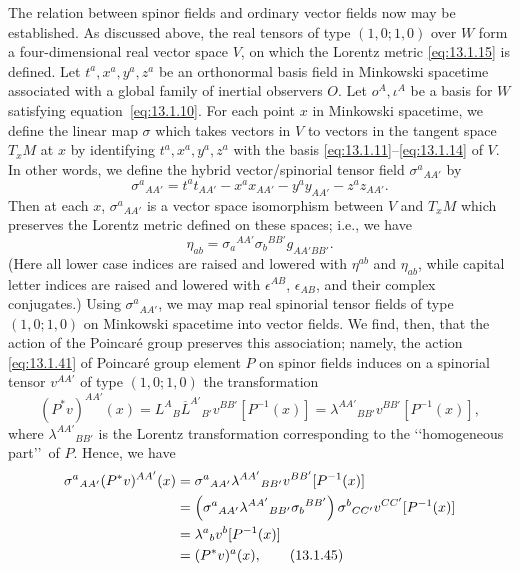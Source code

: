 The relation between spinor fields and ordinary vector fields now may be established.
As discussed above, the real tensors of type \((1,0;1,0)\) over \(W\) form a
four-dimensional real vector space \(V\), on which the Lorentz metric
\eqref{eq:13.1.15} is defined. Let \(t^a,x^a,y^a,z^a\) be an orthonormal basis field
in Minkowski spacetime associated with a global family of inertial observers \(O\).
Let \(o^A,\iota^A\) be a basis for \(W\) satisfying equation~\eqref{eq:13.1.10}. For
each point \(x\) in Minkowski spacetime, we define the linear map \(\sigma\) which
takes vectors in \(V\) to vectors in the tangent space \(T_xM\) at \(x\) by
identifying \(t^a,x^a,y^a,z^a\) with the basis
\eqref{eq:13.1.11}--\eqref{eq:13.1.14} of \(V\). In other words, we define the
hybrid vector/spinorial tensor field \(\sigma^a{}_{AA'}\) by
\begin{equation}
  \sigma^a{}_{AA'}=t^a t_{AA'}-x^a x_{AA'}-y^a y_{AA'}-z^a z_{AA'}.
  \tag{13.1.42}\label{eq:13.1.42}
\end{equation}
Then at each \(x\), \(\sigma^a{}_{AA'}\) is a vector space isomorphism between
\(V\) and \(T_xM\) which preserves the Lorentz metric defined on these spaces; i.e.,
we have
\begin{equation}
  \eta_{ab}=\sigma_a{}^{AA'}\sigma_b{}^{BB'}g_{AA'BB'}.
  \tag{13.1.43}\label{eq:13.1.43}
\end{equation}
(Here all lower case indices are raised and lowered with \(\eta^{ab}\) and
\(\eta_{ab}\), while capital letter indices are raised and lowered with
\(\epsilon^{AB}\), \(\epsilon_{AB}\), and their complex conjugates.) Using
\(\sigma^a{}_{AA'}\), we may map real spinorial tensor fields of type \((1,0;1,0)\)
on Minkowski spacetime into vector fields. We find, then, that the action of the
Poincar\'e group preserves this association; namely, the action
\eqref{eq:13.1.41} of Poincar\'e group element \(P\) on spinor fields induces on a
spinorial tensor \(v^{AA'}\) of type \((1,0;1,0)\) the transformation
\begin{equation}
  (P^*v)^{AA'}(x)
  =L^A{}_B\overline L^{A'}{}_{B'}v^{BB'}[P^{-1}(x)]
  =\lambda^{AA'}{}_{BB'}v^{BB'}[P^{-1}(x)],
  \tag{13.1.44}\label{eq:13.1.44}
\end{equation}
where \(\lambda^{AA'}{}_{BB'}\) is the Lorentz transformation corresponding to the
\lq\lq homogeneous part\rq\rq\ of \(P\). Hence, we have
\begin{align}
  \sigma^a{}_{AA'}(P^*v)^{AA'}(x)
    &=\sigma^a{}_{AA'}\lambda^{AA'}{}_{BB'}v^{BB'}[P^{-1}(x)]\notag\\
    &=\left(\sigma^a{}_{AA'}\lambda^{AA'}{}_{BB'}\sigma_b{}^{BB'}\right)
      \sigma^b{}_{CC'}v^{CC'}[P^{-1}(x)]\notag\\
    &=\lambda^a{}_b v^b[P^{-1}(x)]\notag\\
    &=(P^*v)^a(x),
  \tag{13.1.45}\label{eq:13.1.45}
\end{align}
